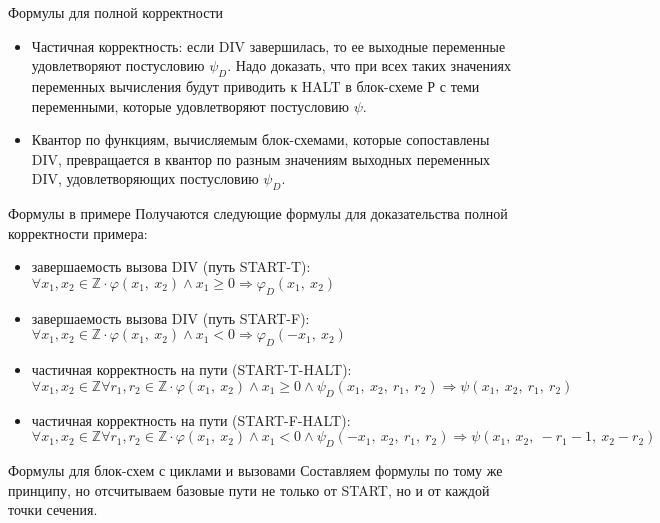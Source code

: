 \documentclass[hyperref={unicode=true}]{beamer}
\begin{document}
    \begin{frame}{Формулы для полной корректности}
    \begin{itemize}
    \item Частичная корректность: если DIV завершилась, то ее выходные
            переменные удовлетворяют постусловию $\psi_D$. Надо доказать,
            что при всех таких значениях переменных вычисления будут
            приводить к HALT в блок-схеме Р с теми переменными, которые
            удовлетворяют постусловию $\psi$.
    \item Квантор по функциям, вычисляемым блок-схемами, которые
            сопоставлены DIV, превращается в квантор по разным значениям
            выходных переменных DIV, удовлетворяющих постусловию $\psi_D$.
    \end{itemize}
    \end{frame}

    \begin{frame}{Формулы в примере}
    Получаются следующие формулы для доказательства полной корректности
    примера:

    \begin{itemize}
    \item завершаемость вызова DIV (путь START-T):
        $\forall x_1, x_2 \in \mathbb{Z} \cdot
                \varphi(x_1,~x_2) \land x_1 \geq 0
                \Rightarrow \varphi_D(x_1,~x_2)$
    \item завершаемость вызова DIV (путь START-F):
        $\forall x_1, x_2 \in \mathbb{Z} \cdot
                \varphi(x_1,~x_2) \land x_1 < 0
                \Rightarrow \varphi_D(-x_1,~x_2)$
    \item частичная корректность на пути (START-T-HALT):
        $\forall x_1, x_2 \in \mathbb{Z} \forall r_1, r_2 \in \mathbb{Z} \cdot
                \varphi(x_1,~x_2) \land x_1 \geq 0 \land
                \psi_D(x_1,~x_2,~r_1,~r_2)
                \Rightarrow \psi(x_1,~x_2,~r_1,~r_2)$
    \item частичная корректность на пути (START-F-HALT):
        $\forall x_1, x_2 \in \mathbb{Z} \forall r_1, r_2 \in \mathbb{Z} \cdot
                \varphi(x_1,~x_2) \land x_1 < 0 \land
                \psi_D(-x_1,~x_2,~r_1,~r_2)
                \Rightarrow \psi(x_1,~x_2,~-r_1-1,~x_2 - r_2)$
    \end{itemize}
    \end{frame}

    \begin{frame}{Формулы для блок-схем с циклами и вызовами}
    Составляем формулы по тому же принципу, но отсчитываем
    базовые пути не только от START, но и от каждой точки сечения.
    \end{frame}
\end{document}

